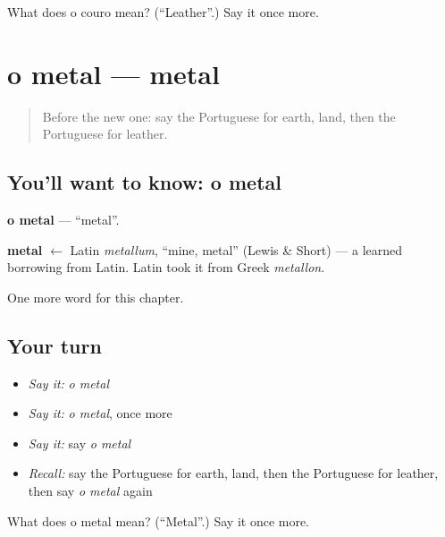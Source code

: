 \begin{tcolorbox}[breakable,colback=teal!4,colframe=teal!35!black,title={Before you move on}]
What does o couro mean? (\textquotedblleft{}Leather\textquotedblright{}.) Say it once more.
\end{tcolorbox}
\section[o metal]{o metal — metal}

\label{lesson:PT-C165-metal}



\begin{quote}
Before the new one: say the Portuguese for earth, land, then the Portuguese for leather.
\end{quote}

\subsection*{You'll want to know: o metal}
\textbf{o metal} — \textquotedblleft{}metal\textquotedblright{}.

\begin{cousinweb}
\textbf{metal} $\leftarrow$ Latin \emph{metallum}, \textquotedblleft{}mine, metal\textquotedblright{} (Lewis \& Short) — a learned borrowing from Latin. Latin took it from Greek \emph{metallon}.
\end{cousinweb}

\begin{grammarlens}[title={What you've built}]
One more word for this chapter.
\end{grammarlens}

\subsection*{Your turn}
\begin{itemize}
\raggedright
  \item \emph{Say it:} \emph{o metal}
  \item \emph{Say it:} \emph{o metal}, once more
  \item \emph{Say it:} say \emph{o metal}
  \item \emph{Recall:} say the Portuguese for earth, land, then the Portuguese for leather, then say \emph{o metal} again
\end{itemize}

\begin{tcolorbox}[breakable,colback=teal!4,colframe=teal!35!black,title={Before you move on}]
What does o metal mean? (\textquotedblleft{}Metal\textquotedblright{}.) Say it once more.
\end{tcolorbox}
